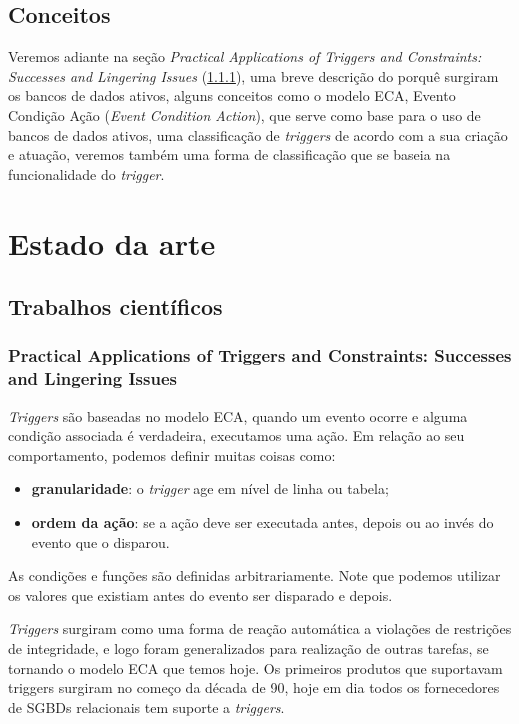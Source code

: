 \documentclass[conference]{IEEEtran}
\begin{document}
  \subsection{Conceitos}
	Veremos adiante na seção \textit{Practical Applications of Triggers and Constraints: Successes and Lingering Issues} (\ref{subsubsec: article1}), uma breve descrição do porquê surgiram os bancos de dados ativos, alguns conceitos como o modelo ECA, Evento Condição Ação (\textit{Event Condition Action}), que serve como base para o uso de bancos de dados ativos, uma classificação de \textit{triggers} de acordo com a sua criação e atuação, veremos também uma forma de classificação que se baseia na funcionalidade do \textit{trigger}.

\section{Estado da arte}
  \subsection{Trabalhos científicos}
    \subsubsection{Practical Applications of Triggers and Constraints: Successes and Lingering Issues}\label{subsubsec: article1}
    
    \textit{Triggers} são baseadas no modelo ECA, quando um evento ocorre e alguma condição associada é verdadeira, executamos uma ação. Em relação ao seu comportamento, podemos definir muitas coisas como:
  
    \begin{itemize}
      \item \textbf{granularidade}: o \textit{trigger} age em nível de linha ou tabela;
      \item \textbf{ordem da ação}: se a ação deve ser executada antes, depois ou ao invés do evento que o disparou.
    \end{itemize}
  
    As condições e funções são definidas arbitrariamente. Note que podemos utilizar os valores que existiam antes do evento ser disparado e depois.

    \textit{Triggers} surgiram como uma forma de reação automática a violações de restrições de integridade, e logo foram generalizados para realização de outras tarefas, se tornando o modelo ECA que temos hoje. Os primeiros produtos que suportavam triggers surgiram no começo da década de 90, hoje em dia todos os fornecedores de SGBDs relacionais tem suporte a \textit{triggers}.
\end{document}
